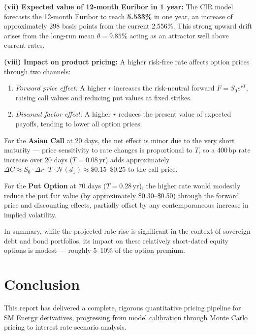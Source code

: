 \documentclass[12pt,a4paper]{article}
\begin{document}
\textbf{(vii) Expected value of 12-month Euribor in 1 year:} The CIR model forecasts the 12-month Euribor to reach \textbf{5.533\%} in one year, an increase of approximately 298 basis points from the current 2.556\%. This strong upward drift arises from the long-run mean $\theta = 9.85\%$ acting as an attractor well above current rates.

\textbf{(viii) Impact on product pricing:} A higher risk-free rate affects option prices through two channels:
\begin{enumerate}[leftmargin=2em]
  \item \textit{Forward price effect:} A higher $r$ increases the risk-neutral forward $F = S_0 e^{rT}$, raising call values and reducing put values at fixed strikes.
  \item \textit{Discount factor effect:} A higher $r$ reduces the present value of expected payoffs, tending to lower all option prices.
\end{enumerate}
For the \textbf{Asian Call} at 20 days, the net effect is minor due to the very short maturity --- price sensitivity to rate changes is proportional to $T$, so a 400\,bp rate increase over 20 days ($T = 0.08$\,yr) adds approximately $\Delta C \approx S_0 \cdot \Delta r \cdot T \cdot \mathcal{N}(d_1) \approx \$0.15$--\$0.25 to the call price.

For the \textbf{Put Option} at 70 days ($T = 0.28$\,yr), the higher rate would modestly reduce the put fair value (by approximately \$0.30--\$0.50) through the forward price and discounting effects, partially offset by any contemporaneous increase in implied volatility.

In summary, while the projected rate rise is significant in the context of sovereign debt and bond portfolios, its impact on these relatively short-dated equity options is modest --- roughly 5--10\% of the option premium.

\newpage
\section{Conclusion}

This report has delivered a complete, rigorous quantitative pricing pipeline for SM Energy derivatives, progressing from model calibration through Monte Carlo pricing to interest rate scenario analysis.
\end{document}
